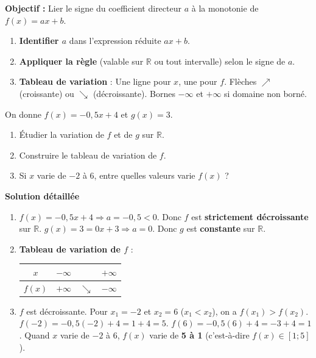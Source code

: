 \documentclass[11pt]{article}
\begin{document}
\begin{methode}
    \textbf{Objectif :} Lier le signe du coefficient directeur $a$ à la monotonie de $f(x)=ax+b$.
    \begin{enumerate}
        \item \textbf{Identifier $a$} dans l'expression réduite $ax+b$.
        \item \textbf{Appliquer la règle} (valable sur $\mathbb{R}$ ou tout intervalle) selon le signe de $a$.
        \item \textbf{Tableau de variation} : Une ligne pour $x$, une pour $f$. Flèches $\nearrow$ (croissante) ou $\searrow$ (décroissante). Bornes $-\infty$ et $+\infty$ si domaine non borné.
    \end{enumerate}
\end{methode}

\begin{exoresolu}
    On donne $f(x) = -0,5x + 4$ et $g(x) = 3$.
    \begin{enumerate}
        \item Étudier la variation de $f$ et de $g$ sur $\mathbb{R}$.
        \item Construire le tableau de variation de $f$.
        \item Si $x$ varie de $-2$ à $6$, entre quelles valeurs varie $f(x)$ ?
    \end{enumerate}
    \tcblower
    \textbf{Solution détaillée}
    \begin{enumerate}
        \item $f(x) = -0,5x + 4 \Rightarrow a = -0,5 < 0$. Donc $f$ est \textbf{strictement décroissante} sur $\mathbb{R}$.
        $g(x) = 3 = 0x + 3 \Rightarrow a = 0$. Donc $g$ est \textbf{constante} sur $\mathbb{R}$.
        \item \textbf{Tableau de variation de $f$} :
        \begin{center}
        \begin{tabular}{|c|ccc|}\hline
        $x$ & $-\infty$ & & $+\infty$ \\ \hline
        $f(x)$ & $+\infty$ & $\searrow$ & $-\infty$ \\ \hline
        \end{tabular}
        \end{center}
        \item $f$ est décroissante. Pour $x_1 = -2$ et $x_2 = 6$ ($x_1 < x_2$), on a $f(x_1) > f(x_2)$.
        $f(-2) = -0,5(-2)+4 = 1+4 = 5$.
        $f(6) = -0,5(6)+4 = -3+4 = 1$.
        Quand $x$ varie de $-2$ à $6$, $f(x)$ varie de \textbf{5 à 1} (c'est-à-dire $f(x) \in [1 ; 5]$).
    \end{enumerate}
\end{exoresolu}
\end{document}
